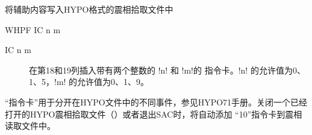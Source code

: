\label{cmd:whpf}

将辅助内容写入HYPO格式的震相拾取文件中

\begin{SACSTX}
WHPF IC n m
\end{SACSTX}

\begin{description}
\item [IC n m]  在第18和19列插入带有两个整数的 !n! 和 !m!的
    指令卡。!n! 的允许值为0、1、5，!m! 的允许值为0、1、9。
\end{description}

``指令卡''用于分开在HYPO文件中的不同事件，参见HYPO71手册。关闭一个已经
打开的HYPO震相拾取文件（）或者退出SAC时，将自动添加
``10''指令卡到震相读取文件中。
